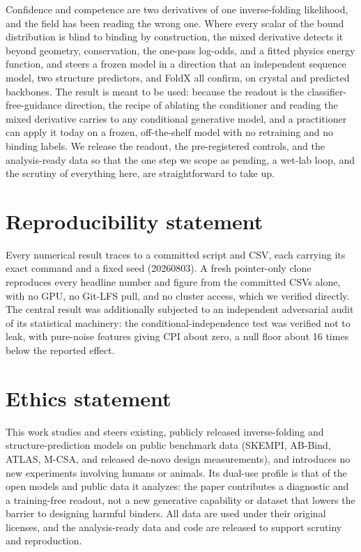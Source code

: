 \documentclass{article} %
\begin{document}
Confidence and competence are two derivatives of one inverse-folding likelihood, and the field has been reading the
wrong one. Where every scalar of the bound distribution is blind to binding by construction, the mixed derivative
detects it beyond geometry, conservation, the one-pass log-odds, and a fitted physics energy function, and steers a
frozen model in a direction that an independent sequence model, two structure predictors, and FoldX all confirm, on
crystal and predicted backbones. The result is meant to be used: because the readout is the classifier-free-guidance
direction, the recipe of ablating the conditioner and reading the mixed derivative carries to any conditional
generative model, and a practitioner can apply it today on a frozen, off-the-shelf model with no retraining and no
binding labels. We release the readout, the pre-registered controls, and the analysis-ready data so that the one
step we scope as pending, a wet-lab loop, and the scrutiny of everything here, are straightforward to take up.

\section*{Reproducibility statement}

Every numerical result traces to a committed script and CSV, each carrying its exact command and a fixed seed
(20260803). A fresh pointer-only clone reproduces every headline number and figure from the committed CSVs alone,
with no GPU, no Git-LFS pull, and no cluster access, which we verified directly. The central result was
additionally subjected to an independent adversarial audit of its statistical machinery: the
conditional-independence test was verified not to leak, with pure-noise features giving CPI about zero, a null floor
about 16 times below the reported effect.

\section*{Ethics statement}

This work studies and steers existing, publicly released inverse-folding and structure-prediction models on public
benchmark data (SKEMPI, AB-Bind, ATLAS, M-CSA, and released de-novo design measurements), and introduces no new
experiments involving humans or animals. Its dual-use profile is that of the open models and public data it
analyzes: the paper contributes a diagnostic and a training-free readout, not a new generative capability or
dataset that lowers the barrier to designing harmful binders. All data are used under their original licenses, and
the analysis-ready data and code are released to support scrutiny and reproduction.
\end{document}
